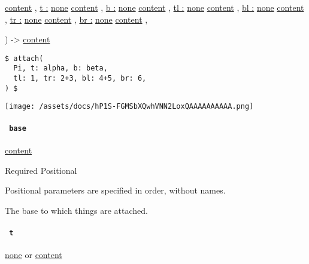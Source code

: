 { \href{/docs/reference/foundations/content/}{content} , } {
\hyperref[functions-attach-parameters-t]{t :}
\href{/docs/reference/foundations/none/}{none}
\href{/docs/reference/foundations/content/}{content} , } {
\hyperref[functions-attach-parameters-b]{b :}
\href{/docs/reference/foundations/none/}{none}
\href{/docs/reference/foundations/content/}{content} , } {
\hyperref[functions-attach-parameters-tl]{tl :}
\href{/docs/reference/foundations/none/}{none}
\href{/docs/reference/foundations/content/}{content} , } {
\hyperref[functions-attach-parameters-bl]{bl :}
\href{/docs/reference/foundations/none/}{none}
\href{/docs/reference/foundations/content/}{content} , } {
\hyperref[functions-attach-parameters-tr]{tr :}
\href{/docs/reference/foundations/none/}{none}
\href{/docs/reference/foundations/content/}{content} , } {
\hyperref[functions-attach-parameters-br]{br :}
\href{/docs/reference/foundations/none/}{none}
\href{/docs/reference/foundations/content/}{content} , }

) -\textgreater{} \href{/docs/reference/foundations/content/}{content}

\begin{verbatim}
$ attach(
  Pi, t: alpha, b: beta,
  tl: 1, tr: 2+3, bl: 4+5, br: 6,
) $
\end{verbatim}

\texttt{[image: /assets/docs/hP1S-FGMSbXQwhVNN2LoxQAAAAAAAAAA.png]}

\paragraph{\texorpdfstring{\texttt{\ base\ }}{ base }}\label{functions-attach-base}

\href{/docs/reference/foundations/content/}{content}

{Required} {{ Positional }}

\label{functions-attach-base-positional-tooltip}
Positional parameters are specified in order, without names.

The base to which things are attached.

\paragraph{\texorpdfstring{\texttt{\ t\ }}{ t }}\label{functions-attach-t}

\href{/docs/reference/foundations/none/}{none} {or}
\href{/docs/reference/foundations/content/}{content}


